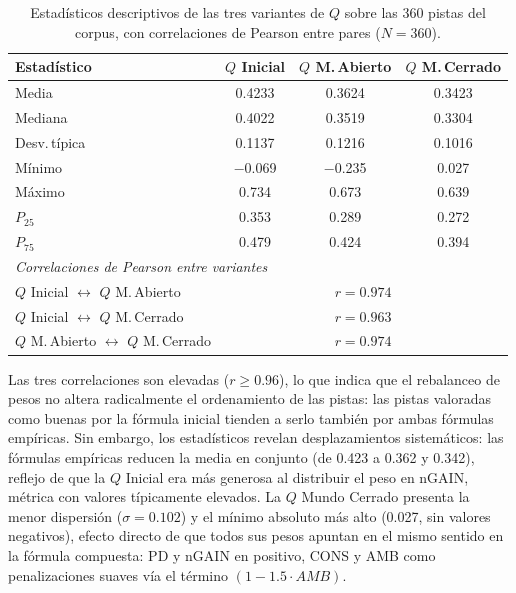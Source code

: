\begin{table}[H]
\centering
\begin{tabular}{lccc}
\hline
Estadístico & $Q$ Inicial & $Q$ M.\,Abierto & $Q$ M.\,Cerrado \\
\hline
Media         & 0.4233    & 0.3624    & 0.3423 \\
Mediana       & 0.4022    & 0.3519    & 0.3304 \\
Desv.\,típica & 0.1137    & 0.1216    & 0.1016 \\
Mínimo        & $-$0.069  & $-$0.235  & 0.027  \\
Máximo        & 0.734     & 0.673     & 0.639  \\
$P_{25}$      & 0.353     & 0.289     & 0.272  \\
$P_{75}$      & 0.479     & 0.424     & 0.394  \\
\hline
\multicolumn{4}{l}{\textit{Correlaciones de Pearson entre variantes}} \\
\hline
$Q$ Inicial $\leftrightarrow$ $Q$ M.\,Abierto     & \multicolumn{3}{c}{$r = 0.974$} \\
$Q$ Inicial $\leftrightarrow$ $Q$ M.\,Cerrado     & \multicolumn{3}{c}{$r = 0.963$} \\
$Q$ M.\,Abierto $\leftrightarrow$ $Q$ M.\,Cerrado & \multicolumn{3}{c}{$r = 0.974$} \\
\hline
\end{tabular}
\caption{Estadísticos descriptivos de las tres variantes de $Q$ sobre las 360 pistas del corpus, con correlaciones de Pearson entre pares ($N=360$).}
\label{tab:q_stats_f2}
\end{table}

Las tres correlaciones son elevadas ($r \geq 0.96$), lo que indica que el rebalanceo de pesos no altera radicalmente el ordenamiento de las pistas: las pistas valoradas como buenas por la fórmula inicial tienden a serlo también por ambas fórmulas empíricas. Sin embargo, los estadísticos revelan desplazamientos sistemáticos: las fórmulas empíricas reducen la media en conjunto (de 0.423 a 0.362 y 0.342), reflejo de que la $Q$ Inicial era más generosa al distribuir el peso en nGAIN, métrica con valores típicamente elevados. La $Q$ Mundo Cerrado presenta la menor dispersión ($\sigma = 0.102$) y el mínimo absoluto más alto (0.027, sin valores negativos), efecto directo de que todos sus pesos apuntan en el mismo sentido en la fórmula compuesta: PD y nGAIN en positivo, CONS y AMB como penalizaciones suaves vía el término $(1-1.5 \cdot AMB)$.

